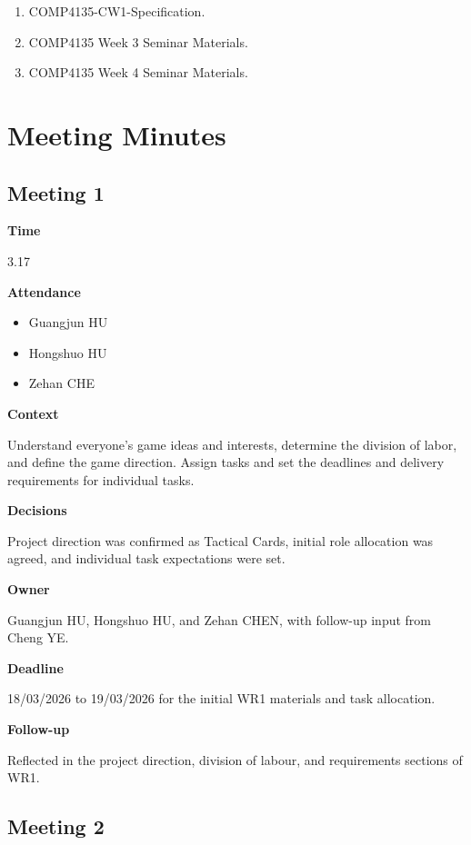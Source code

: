 \documentclass[12pt,a4paper]{report}
\begin{document}
\begin{enumerate}
\item COMP4135-CW1-Specification.
\item COMP4135 Week 3 Seminar Materials.
\item COMP4135 Week 4 Seminar Materials.
\end{enumerate}

\appendix
\chapter{Meeting Minutes}

\section{Meeting 1}

\textbf{Time}

3.17

\textbf{Attendance}

\begin{itemize}
\item Guangjun HU
\item Hongshuo HU
\item Zehan CHE
\end{itemize}

\textbf{Context}

Understand everyone's game ideas and interests, determine the division of labor, and define the game direction. Assign tasks and set the deadlines and delivery requirements for individual tasks.

\textbf{Decisions}

Project direction was confirmed as Tactical Cards, initial role allocation was agreed, and individual task expectations were set.

\textbf{Owner}

Guangjun HU, Hongshuo HU, and Zehan CHEN, with follow-up input from Cheng YE.

\textbf{Deadline}

18/03/2026 to 19/03/2026 for the initial WR1 materials and task allocation.

\textbf{Follow-up}

Reflected in the project direction, division of labour, and requirements sections of WR1.

\section{Meeting 2}
\end{document}

